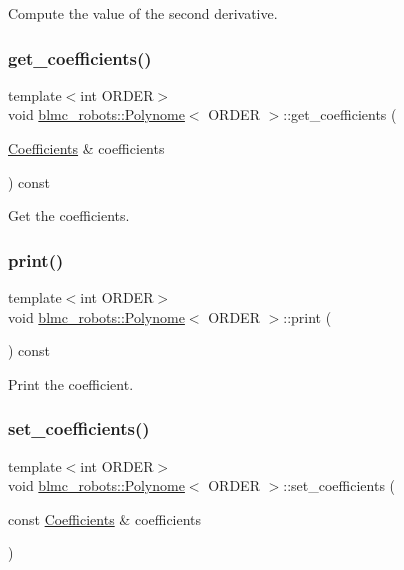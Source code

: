 Compute the value of the second derivative. \mbox{\label{classblmc__robots_1_1Polynome_a18cb2a487969b07ee8a8f8826f991d5d}} 
\subsubsection{\texorpdfstring{get\+\_\+coefficients()}{get\_coefficients()}}
{\footnotesize\ttfamily template$<$int O\+R\+D\+ER$>$ \\
void \hyperlink{classblmc__robots_1_1Polynome}{blmc\+\_\+robots\+::\+Polynome}$<$ O\+R\+D\+ER $>$\+::get\+\_\+coefficients (\begin{DoxyParamCaption}\item[{\hyperlink{classblmc__robots_1_1Polynome_a31e086184f3934b269e8318cce2859eb}{Coefficients} \&}]{coefficients }\end{DoxyParamCaption}) const}

Get the coefficients. \mbox{\label{classblmc__robots_1_1Polynome_ab814c435b1917c8eb12e3d28f15ae81a}} 
\subsubsection{\texorpdfstring{print()}{print()}}
{\footnotesize\ttfamily template$<$int O\+R\+D\+ER$>$ \\
void \hyperlink{classblmc__robots_1_1Polynome}{blmc\+\_\+robots\+::\+Polynome}$<$ O\+R\+D\+ER $>$\+::print (\begin{DoxyParamCaption}{ }\end{DoxyParamCaption}) const}

Print the coefficient. \mbox{\label{classblmc__robots_1_1Polynome_ad8daa2f5ffa1891aac2663519950afae}} 
\subsubsection{\texorpdfstring{set\+\_\+coefficients()}{set\_coefficients()}}
{\footnotesize\ttfamily template$<$int O\+R\+D\+ER$>$ \\
void \hyperlink{classblmc__robots_1_1Polynome}{blmc\+\_\+robots\+::\+Polynome}$<$ O\+R\+D\+ER $>$\+::set\+\_\+coefficients (\begin{DoxyParamCaption}\item[{const \hyperlink{classblmc__robots_1_1Polynome_a31e086184f3934b269e8318cce2859eb}{Coefficients} \&}]{coefficients }\end{DoxyParamCaption})}

